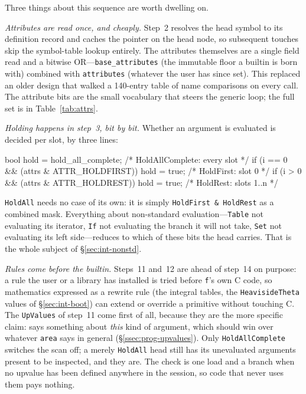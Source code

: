 Three things about this sequence are worth dwelling on.

\emph{Attributes are read once, and cheaply.} Step~2 resolves the head symbol to its
definition record and caches the pointer on the head node, so subsequent touches skip
the symbol-table lookup entirely. The attributes themselves are a single field read
and a bitwise OR---\texttt{base\_attributes} (the immutable floor a builtin is born
with) combined with \texttt{attributes} (whatever the user has since set). This
replaced an older design that walked a 140-entry table of name comparisons on every
call. The attribute bits are the small vocabulary that steers the generic loop; the
full set is in Table~\ref{tab:attrs}.

\emph{Holding happens in step~3, bit by bit.} Whether an argument is evaluated is
decided per slot, by three lines:

\begin{ccode}
bool hold = hold_all_complete;                        /* HoldAllComplete: every slot */
if (i == 0 && (attrs & ATTR_HOLDFIRST)) hold = true;  /* HoldFirst: slot 0           */
if (i >  0 && (attrs & ATTR_HOLDREST))  hold = true;  /* HoldRest:  slots 1..n       */
\end{ccode}

\texttt{HoldAll} needs no case of its own: it is simply \texttt{HoldFirst \& HoldRest}
as a combined mask. Everything about non-standard evaluation---\texttt{Table} not
evaluating its iterator, \texttt{If} not evaluating the branch it will not take,
\texttt{Set} not evaluating its left side---reduces to which of these bits the head
carries. That is the whole subject of \S\ref{sec:int-nonstd}.

\emph{Rules come before the builtin.} Steps~11 and~12 are ahead of step~14 on purpose:
a rule the user or a library has installed is tried before \texttt{f}'s own C code, so mathematics expressed as a rewrite rule (the integral tables, the
\texttt{HeavisideTheta} values of \S\ref{sec:int-boot}) can extend or override a
primitive without touching C. The \texttt{UpValues} of step~11 come first of all, because they are the
more specific claim:  says
something about \emph{this} kind of argument, which should win over whatever
\texttt{area} says in general (\S\ref{ssec:prog-upvalues}). Only
\texttt{HoldAllComplete} switches the scan off; a merely \texttt{HoldAll} head still has
its unevaluated arguments present to be inspected, and they are. The check is one load
and a branch when no upvalue has been defined anywhere in the session, so code that never
uses them pays nothing.

